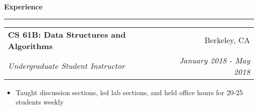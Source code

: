 \documentclass[11pt,letterpaper]{article}
\makeatletter
\newenvironment{topic}[1]
    {
    {\Large \centerline{#1}}
    \vspace*{0.03in}
    \hrule 
    \vspace*{0.05in}
    }
    {}
\newenvironment{event}
    {
    \begin{tabular*}{\textwidth}{l@{\extracolsep{\fill}}r}
    }
    {
    \end{tabular*}
    }
\makeatother
\begin{document}
\begin{topic}{\textbf{Experience}}
        \begin{event}
            \textbf{CS 61B: Data Structures and Algorithms} & Berkeley, CA \\
            \emph{Undergraduate Student Instructor} & \emph{January 2018 - May 2018}
        \end{event}
            \begin{itemize}
                \item Taught discussion sections, led lab sections, and held office hours for 20-25 students weekly
            \end{itemize}
    \end{topic} 
\end{document}
